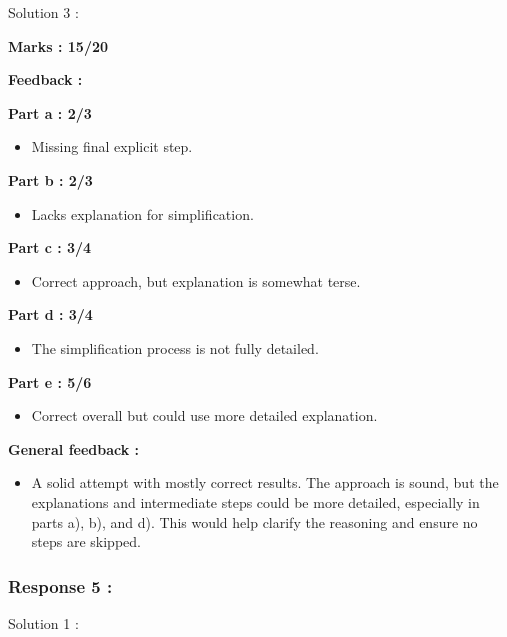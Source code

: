 \documentclass[a4paper,11pt]{article}
\begin{document}
Solution 3 :

\textbf{Marks : 15/20}

\textbf{Feedback :}

\textbf{Part a : 2/3}

\begin{itemize}
    \item Missing final explicit step.
\end{itemize}


\textbf{Part b : 2/3}

\begin{itemize}
    \item Lacks explanation for simplification.
\end{itemize}


\textbf{Part c : 3/4}

\begin{itemize}
    \item Correct approach, but explanation is somewhat terse.
\end{itemize}


\textbf{Part d : 3/4}

\begin{itemize}
    \item The simplification process is not fully detailed.
\end{itemize}



\textbf{Part e : 5/6}

\begin{itemize}
    \item Correct overall but could use more detailed explanation.
\end{itemize}


\textbf{General feedback :}

\begin{itemize}
    \item A solid attempt with mostly correct results. The approach is sound, but the explanations and intermediate steps could be more detailed, especially in parts a), b), and d). This would help clarify the reasoning and ensure no steps are skipped.
\end{itemize}



\subsubsection*{Response 5 :}

Solution 1 :
\end{document}
